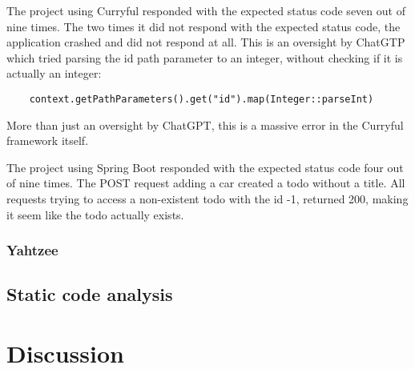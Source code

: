 \documentclass[a4paper]{article}
\begin{document}
\noindent The project using Curryful responded with the expected status code
seven out of nine times. The two times it did not respond with the expected
status code, the application crashed and did not respond at all. This is an
oversight by ChatGTP which tried parsing the id path parameter to an integer,
without checking if it is actually an integer:

\begin{verbatim}
	context.getPathParameters().get("id").map(Integer::parseInt)
\end{verbatim}

\noindent More than just an oversight by ChatGPT, this is a massive error in the
Curryful framework itself.
\newline

\noindent The project using Spring Boot responded with the expected status code
four out of nine times. The POST request adding a car created a todo without a
title. All requests trying to access a non-existent todo with the id -1,
returned 200, making it seem like the todo actually exists.

\subsubsection{Yahtzee}

\subsection{Static code analysis}

\section{Discussion}

\newpage

\listoffigures
\newpage

\listoftables
\newpage


\end{document}
